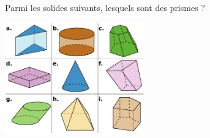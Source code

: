 
\begin{exercice}\label{exo2smath-0244}


    Parmi les solides suivants, lesquels sont des prismes ?

\includegraphics[width=6cm]{prismes.pdf}

\end{exercice}
